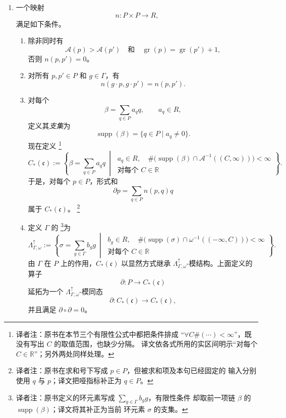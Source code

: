 \begin{definition}
\begin{enumerate}[label=(\arabic*)]
  \item 一个映射
  \[
    n:P\times P\longrightarrow R,
  \]
  满足如下条件。
  \begin{enumerate}[label=(\alph*)]
    \item 除非同时有
    \[
      \mathcal A(p)>\mathcal A(p')
      \quad\text{和}\quad
      \operatorname{gr}(p)=\operatorname{gr}(p')+1,
    \]
    否则 $n(p,p')=0$。

    \item 对所有 $p,p'\in P$ 和 $g\in\Gamma$，有
    \[
      n(g\cdot p,g\cdot p')=n(p,p').
    \]

    \item 对每个\termFormalSum{}
    \[
      \beta=\sum_{q\in P}a_q q,
      \qquad a_q\in R,
    \]
    定义其\emph{支集}为
    \[
      \operatorname{supp}(\beta)
      =\{q\in P\mid a_q\ne0\}.
    \]
    现在定义\termFloerChainGroup{}
    \footnote{译者注：原书在本节三个\personNovikov{}有限性公式中都把条件排成
    “$\forall C\#(\cdots)<\infty$”，既没有写出 $C$ 的取值范围，也缺少分隔。
    译文依各式所用的实区间明示“对每个 $C\in\mathbb R$”；另外两处同样处理。}
    \[
      C_*(\mathfrak c)
      :=
      \left\{
        \beta=\sum_{q\in P}a_q q
        \ \middle|\
        \begin{gathered}
          a_q\in R,\quad
          \#\bigl(\operatorname{supp}(\beta)
            \cap\mathcal A^{-1}((C,\infty))\bigr)<\infty\\
          \text{对每个 }C\in\mathbb R
        \end{gathered}
      \right\}.
    \]
    于是，对每个 $p\in P$，形式和
    \[
      \partial p=\sum_{q\in P}n(p,q)q
    \]
    属于 $C_*(\mathfrak c)$。
    \footnote{译者注：原书在求和号下写成 $p\in P$，但被求和项及本句已经固定的
    输入分别使用 $q$ 与 $p$；译文把哑指标补正为 $q\in P$。}

    \item 定义 $\Gamma$ 的\termNovikovRing{}
    \footnote{译者注：原书定义的环元素写成 $\sum_{g\in\Gamma}b_g g$，有限性条件
    却取前一项链 $\beta$ 的 $\operatorname{supp}(\beta)$；译文将其补正为当前
    环元素 $\sigma$ 的支集。}为
    \[
      \Lambda^\uparrow_{\Gamma,\omega}
      :=
      \left\{
        \sigma=\sum_{g\in\Gamma}b_g g
        \ \middle|\
        \begin{gathered}
          b_g\in R,\quad
          \#\bigl(\operatorname{supp}(\sigma)
            \cap\omega^{-1}((-\infty,C))\bigr)<\infty\\
          \text{对每个 }C\in\mathbb R
        \end{gathered}
      \right\}.
    \]
    由 $\Gamma$ 在 $P$ 上的作用，$C_*(\mathfrak c)$ 以显然方式继承
    $\Lambda^\uparrow_{\Gamma,\omega}$-模结构。上面定义的算子
    \[
      \partial:P\longrightarrow C_*(\mathfrak c)
    \]
    延拓为一个 $\Lambda^\uparrow_{\Gamma,\omega}$-模同态
    \[
      \partial:C_*(\mathfrak c)\longrightarrow C_*(\mathfrak c),
    \]
    并且满足 $\partial\circ\partial=0$。
  \end{enumerate}
\end{enumerate}
\end{definition}

